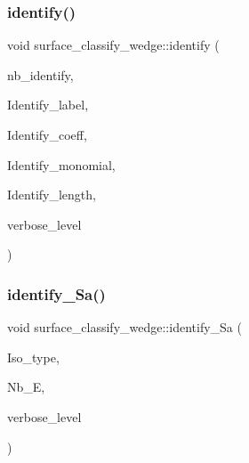 \mbox{\label{classsurface__classify__wedge_a03f9844a500b2b984023075a35bee059}} 
\subsubsection{\texorpdfstring{identify()}{identify()}}
{\footnotesize\ttfamily void surface\+\_\+classify\+\_\+wedge\+::identify (\begin{DoxyParamCaption}\item[{\mbox{\hyperlink{galois_8h_a09fddde158a3a20bd2dcadb609de11dc}{I\+NT}}}]{nb\+\_\+identify,  }\item[{\mbox{\hyperlink{galois_8h_ab6cc7b4aeb6ea31aba2b3fbfc83ff5e6}{B\+Y\+TE}} $\ast$$\ast$}]{Identify\+\_\+label,  }\item[{\mbox{\hyperlink{galois_8h_a09fddde158a3a20bd2dcadb609de11dc}{I\+NT}} $\ast$$\ast$}]{Identify\+\_\+coeff,  }\item[{\mbox{\hyperlink{galois_8h_a09fddde158a3a20bd2dcadb609de11dc}{I\+NT}} $\ast$$\ast$}]{Identify\+\_\+monomial,  }\item[{\mbox{\hyperlink{galois_8h_a09fddde158a3a20bd2dcadb609de11dc}{I\+NT}} $\ast$}]{Identify\+\_\+length,  }\item[{\mbox{\hyperlink{galois_8h_a09fddde158a3a20bd2dcadb609de11dc}{I\+NT}}}]{verbose\+\_\+level }\end{DoxyParamCaption})}

\mbox{\label{classsurface__classify__wedge_a8fdc22ea1850bd4da28ace84adb055a6}} 
\subsubsection{\texorpdfstring{identify\+\_\+\+Sa()}{identify\_Sa()}}
{\footnotesize\ttfamily void surface\+\_\+classify\+\_\+wedge\+::identify\+\_\+\+Sa (\begin{DoxyParamCaption}\item[{\mbox{\hyperlink{galois_8h_a09fddde158a3a20bd2dcadb609de11dc}{I\+NT}} $\ast$}]{Iso\+\_\+type,  }\item[{\mbox{\hyperlink{galois_8h_a09fddde158a3a20bd2dcadb609de11dc}{I\+NT}} $\ast$}]{Nb\+\_\+E,  }\item[{\mbox{\hyperlink{galois_8h_a09fddde158a3a20bd2dcadb609de11dc}{I\+NT}}}]{verbose\+\_\+level }\end{DoxyParamCaption})}

